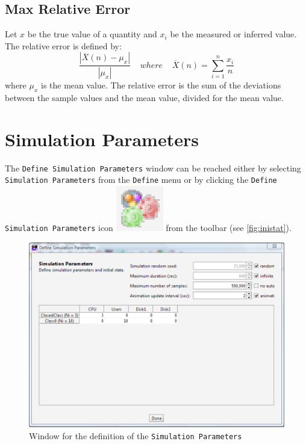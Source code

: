 \subsection{Max Relative Error}
\label{mrerr} Let $x$ be the true value of a quantity and $x_i$ be
the measured or inferred value. The relative error is defined by:
\[ \frac{|\overline{X}(n) - \mu_x|} {|\mu_x|} \;\;\;\; where
\;\;\;\;\overline{X}(n) = \sum_{i=1}^{n}  \frac{x_i}{n}\] where
$\mu_x$ is the mean value.  The relative error is the sum of the
deviations between the sample values and the mean value, divided
for the mean value.

\section{Simulation Parameters}
The \texttt{Define Simulation Parameters} window can be reached
either by selecting \texttt{Simulation Parameters} from the
\texttt{Define} menu or by clicking the \texttt{Define Simulation
Parameters} icon
\includegraphics[scale=.5]{img/jsimg/defineSimulationParameters.eps}
from the toolbar (see \autoref{fig:inistat}).

\begin{figure}[h]
    \begin{center}
        \includegraphics[scale=.5]{img/jsimg/6.2.eps}
    \end{center}
    \caption{Window for the definition of the \texttt{Simulation Parameters}}
    \label{fig:inistat}
\end{figure}

